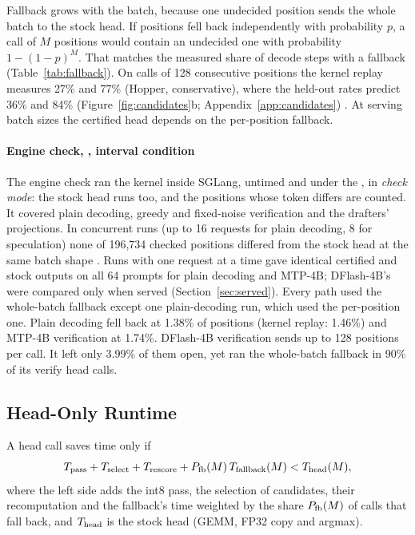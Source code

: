 Fallback grows with the batch, because one undecided position sends the whole batch to the stock head. If positions fell back independently with probability $p$, a call of $M$ positions would contain an undecided one with probability $1-(1-p)^M$. That matches the measured share of decode steps with a fallback (Table~\ref{tab:fallback}). On calls of 128 consecutive positions the kernel replay measures 27\% and 77\% (Hopper, conservative), where the held-out rates predict 36\% and 84\% (Figure~\ref{fig:candidates}b; Appendix~\ref{app:candidates}) . At serving batch sizes the certified head depends on the per-position fallback.

\paragraph{Engine check, \Rstock{}, interval condition}\label{sec:engine} The engine check ran the kernel inside SGLang, untimed and under the \modelcons, in \emph{check mode}: the stock head runs too, and the positions whose token differs are counted. It covered plain decoding, greedy and fixed-noise verification and the drafters' projections. In concurrent runs (up to 16 requests for plain decoding, 8 for speculation) none of 196,734 checked positions differed from the stock head at the same batch shape . Runs with one request at a time gave identical certified and stock outputs on all 64 prompts for plain decoding and MTP-4B; DFlash-4B's were compared only when served (Section~\ref{sec:served}). Every path used the whole-batch fallback except one plain-decoding run, which used the per-position one. Plain decoding fell back at 1.38\% of positions (kernel replay: 1.46\%) and MTP-4B verification at 1.74\%. DFlash-4B verification sends up to 128 positions per call. It left only 3.99\% of them open, yet ran the whole-batch fallback in 90\% of its verify head calls.

\subsection{Head-Only Runtime}\label{sec:kernel-runtime}
A head call saves time only if
\begin{equation}
T_{\rm pass}+T_{\rm select}+T_{\rm rescore}+P_{\rm fb}(M)\,T_{\rm fallback}(M)<T_{\rm head}(M),\label{eq:headgate}
\end{equation}
where the left side adds the int8 pass, the selection of candidates, their recomputation and the fallback's time weighted by the share $P_{\rm fb}(M)$ of calls that fall back, and $T_{\rm head}$ is the stock head (GEMM, FP32 copy and argmax).

